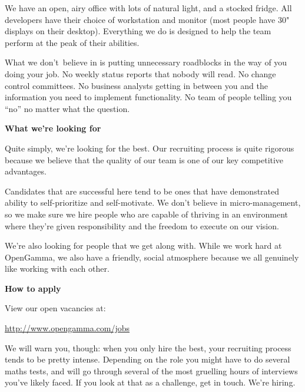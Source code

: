 \documentclass[custom, plainsections]{sciposter}
\begin{document}
\begin{multicols*}{3}
We have an open, airy office with lots of natural light, and a stocked fridge. All developers have their choice of workstation and monitor (most people have 30" displays on their desktop). Everything we do is designed to help the team perform at the peak of their abilities.

What we don't\ believe in is putting unnecessary roadblocks in the way of you doing your job. No weekly status reports that nobody will read. No change control committees. No business analysts getting in between you and the information you need to implement functionality. No team of people telling you ``no'' no matter what the question.

\vspace{0.2cm}
\textbf{What we're looking for}
\vspace{0.2cm}

Quite simply, we're looking for the best. Our recruiting process is quite rigorous because we believe that the quality of our team is one of our key competitive advantages.

Candidates that are successful here tend to be ones that have demonstrated ability to self-prioritize and self-motivate. We don't believe in micro-management, so we make sure we hire people who are capable of thriving in an environment where they're given responsibility and the freedom to execute on our vision.

We're also looking for people that we get along with. While we work hard at OpenGamma, we also have a friendly, social atmosphere because we all genuinely like working with each other.

\vspace{0.2cm}
\textbf{How to apply}
\vspace{0.2cm}

View our open vacancies at:

\url{http://www.opengamma.com/jobs}

We will warn you, though: when you only hire the best, your recruiting process tends to be pretty intense. Depending on the role you might have to do several maths tests, and will go through several of the most gruelling hours of interviews you've likely faced. If you look at that as a challenge, get in touch. We're hiring.

\end{multicols*}

\setlength\columnseprule{0.2pt}
\pagebreak
\end{document}
